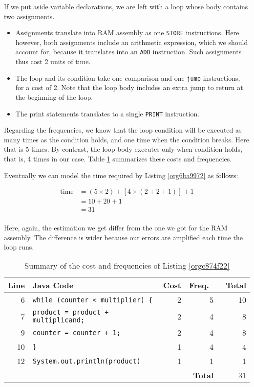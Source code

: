 \documentclass[11pt]{article}
\begin{document}
If we put aside variable declarations, we are left with a loop whose
body contains two assignments.

\begin{itemize}
\item Assignments translate into RAM assembly as one \texttt{STORE}
instructions. Here however, both assignments include an arithmetic
expression, which we should account for, because it translates into
an \texttt{ADD} instruction. Such assignments thus cost 2 units of time.

\item The loop and its condition take one comparison and one \texttt{jump}
instructions, for a cost of 2. Note that the loop body includes an
extra jump to return at the beginning of the loop.

\item The print statements translates to a single \texttt{PRINT} instruction.
\end{itemize}

Regarding the frequencies, we know that the loop condition will be
executed as many times as the condition holds, and one time when the
condition breaks. Here that is 5 times. By contrast, the loop body
executes only when condition holds, that is, 4 times in our case. Table
\ref{tab:orgb0cd28a} summarizes these costs and frequencies.

Eventually we can model the time required by Listing
\ref{org6ba9972} as follows:

\begin{align*}
 \text{time} & = (5 \times 2) + [ 4 \times (2 + 2 + 1) ] + 1 \\
             & = 10 + 20 + 1 \\
             & = 31 \\
\end{align*}

Here, again, the estimation we get differ from the one we got for the
RAM assembly. The difference is wider because our errors are amplified
each time the loop runs.

\begin{table}[htbp]
\caption{\label{tab:orgb0cd28a}Summary of the cost and frequencies of Listing \ref{orge874f22}}
\centering
\begin{tabular}{rlrrr}
Line & Java Code & Cost & Freq.  &  Total\\
\hline
6 & \texttt{while (counter < multiplier) \{} & 2 & 5 & 10\\
7 & \texttt{product = product + multiplicand;} & 2 & 4 & 8\\
9 & \texttt{counter = counter + 1;} & 2 & 4 & 8\\
10 & \texttt{\}} & 1 & 4 & 4\\
12 & \texttt{System.out.println(product)} & 1 & 1 & 1\\
\hline
 &  &  & \textbf{Total} & 31\\
\end{tabular}
\end{table}
\end{document}
